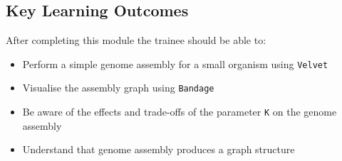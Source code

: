 
\chapter{\moduleTitle}
\newpage


%
\section{Key Learning Outcomes}

After completing this module the trainee should be able to:
\begin{itemize}
  \item Perform a simple genome assembly for a small organism using \texttt{Velvet}
  \item Visualise the assembly graph using \texttt{Bandage}
  \item Be aware of the effects and trade-offs of the parameter \texttt{K} on the genome assembly
  \item Understand that genome assembly produces a graph structure
\end{itemize}

